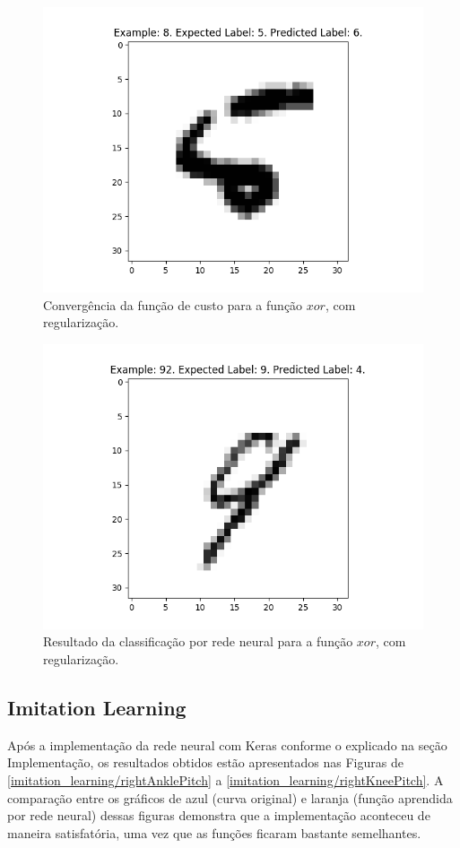 \documentclass[conference]{IEEEtran}
\begin{document}
\begin{figure}[htbp]
\centering
\centerline{\includegraphics[scale=0.5]{imagens/misclassified_image_8.png}}
\caption{Convergência da função de custo para a função $xor$, com regularização.}
\label{misclassified_image_8}
\end{figure}

\begin{figure}[htbp]
\centering
\centerline{\includegraphics[scale=0.5]{imagens/misclassified_image_92.png}}
\caption{Resultado da classificação por rede neural para a função $xor$, com regularização.}
\label{misclassified_image_92}
\end{figure}

\subsection{Imitation Learning}
Após a implementação da rede neural com Keras conforme o explicado na seção Implementação, os resultados obtidos estão apresentados nas Figuras de \ref{imitation_learning/rightAnklePitch} a \ref{imitation_learning/rightKneePitch}. A comparação entre os gráficos de azul (curva original) e laranja (função aprendida por rede neural) dessas figuras demonstra que a implementação aconteceu de maneira satisfatória, uma vez que as funções ficaram bastante semelhantes.
\end{document}
